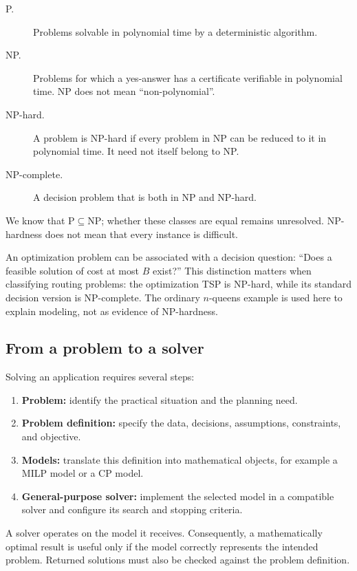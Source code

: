 \begin{description}
\item[P.] Problems solvable in polynomial time by a deterministic algorithm.
\item[NP.] Problems for which a yes-answer has a certificate verifiable in
polynomial time. NP does not mean ``non-polynomial''.
\item[NP-hard.] A problem is NP-hard if every problem in NP can be reduced
to it in polynomial time. It need not itself belong to NP.
\item[NP-complete.] A decision problem that is both in NP and NP-hard.
\end{description}

We know that $\mathrm{P}\subseteq\mathrm{NP}$; whether these classes are equal
remains unresolved. NP-hardness does not mean that every instance is difficult.

An optimization problem can be associated with a decision question: ``Does a
feasible solution of cost at most $B$ exist?'' This distinction matters when
classifying routing problems: the optimization TSP is NP-hard, while its
standard decision version is NP-complete. The ordinary $n$-queens example is
used here to explain modeling, not as evidence of NP-hardness.

\subsection{From a problem to a solver}

Solving an application requires several steps:
\begin{enumerate}
 \item \textbf{Problem:} identify the practical situation and the planning need.
 \item \textbf{Problem definition:} specify the data, decisions, assumptions,
 constraints, and objective.
 \item \textbf{Models:} translate this definition into mathematical objects,
 for example a MILP model or a CP model.
 \item \textbf{General-purpose solver:} implement the selected model in a
 compatible solver and configure its search and stopping criteria.
\end{enumerate}

A solver operates on the model it receives. Consequently, a mathematically
optimal result is useful only if the model correctly represents the intended
problem. Returned solutions must also be checked against the problem definition.

